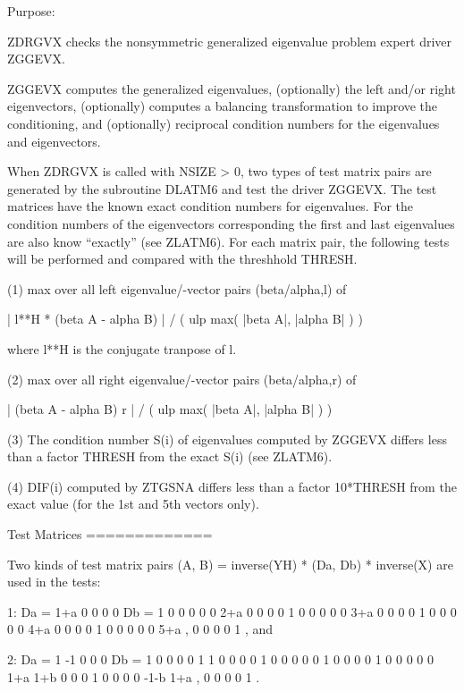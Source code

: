 \begin{DoxyParagraph}{Purpose\+: }
\begin{DoxyVerb} ZDRGVX checks the nonsymmetric generalized eigenvalue problem
 expert driver ZGGEVX.

 ZGGEVX computes the generalized eigenvalues, (optionally) the left
 and/or right eigenvectors, (optionally) computes a balancing
 transformation to improve the conditioning, and (optionally)
 reciprocal condition numbers for the eigenvalues and eigenvectors.

 When ZDRGVX is called with NSIZE > 0, two types of test matrix pairs
 are generated by the subroutine DLATM6 and test the driver ZGGEVX.
 The test matrices have the known exact condition numbers for
 eigenvalues. For the condition numbers of the eigenvectors
 corresponding the first and last eigenvalues are also know
 ``exactly'' (see ZLATM6).
 For each matrix pair, the following tests will be performed and
 compared with the threshhold THRESH.

 (1) max over all left eigenvalue/-vector pairs (beta/alpha,l) of

    | l**H * (beta A - alpha B) | / ( ulp max( |beta A|, |alpha B| ) )

     where l**H is the conjugate tranpose of l.

 (2) max over all right eigenvalue/-vector pairs (beta/alpha,r) of

       | (beta A - alpha B) r | / ( ulp max( |beta A|, |alpha B| ) )

 (3) The condition number S(i) of eigenvalues computed by ZGGEVX
     differs less than a factor THRESH from the exact S(i) (see
     ZLATM6).

 (4) DIF(i) computed by ZTGSNA differs less than a factor 10*THRESH
     from the exact value (for the 1st and 5th vectors only).

 Test Matrices
 =============

 Two kinds of test matrix pairs
          (A, B) = inverse(YH) * (Da, Db) * inverse(X)
 are used in the tests:

 1: Da = 1+a   0    0    0    0    Db = 1   0   0   0   0
          0   2+a   0    0    0         0   1   0   0   0
          0    0   3+a   0    0         0   0   1   0   0
          0    0    0   4+a   0         0   0   0   1   0
          0    0    0    0   5+a ,      0   0   0   0   1 , and

 2: Da =  1   -1    0    0    0    Db = 1   0   0   0   0
          1    1    0    0    0         0   1   0   0   0
          0    0    1    0    0         0   0   1   0   0
          0    0    0   1+a  1+b        0   0   0   1   0
          0    0    0  -1-b  1+a ,      0   0   0   0   1 .


\end{DoxyVerb}
\end{DoxyParagraph}
